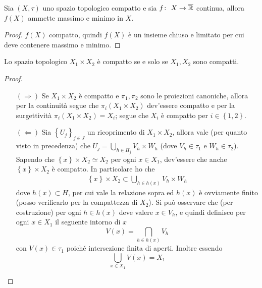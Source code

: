 \begin{corollary}[Weierstrass]
	Sia $(X, \tau)$ uno spazio topologico compatto e sia $f \colon\ X \rightarrow \overline{\mathbb{R}}$ continua, allora $f(X)$ ammette massimo e minimo in $X$.
\end{corollary} 
\begin{proof}
	$f(X)$ compatto, quindi $f(X)$ è un insieme chiuso e limitato per cui deve contenere massimo e minimo.
\end{proof}

\begin{theorem}[Tychonoff]
	Lo spazio topologico $X_1 \times X_2$ è compatto se e solo se $X_1,X_2$ sono compatti. 
\end{theorem} 
\begin{proof}\
	\begin{enumerate}
		\item[$(\Rightarrow)$] Se $X_1 \times X_2$ è compatto e $\pi_1, \pi_2$ sono le proiezioni canoniche, allora per la continuità segue che $\pi_i(X_1 \times X_2)$ dev'essere compatto e per la surgettività $ \pi_i(X_1 \times X_2) = X_i$; segue che $X_i$ è compatto per $i \in \left\{1,2\right\}$.
		\item[$(\Leftarrow)$] Sia $\left\{U_j\right\}_{j \in J}$ un ricoprimento di $X_1 \times X_2$, allora vale (per quanto visto in precedenza) che $U_j = \bigcup_{h \in H_j} V_h \times W_h$ (dove $V_h \in \tau_1$ e $W_h \in \tau_2$). \\ Sapendo che $\left\{x\right\} \times X_2 \simeq X_2$ per ogni  $x \in X_1$, dev'essere che anche $\left\{x\right\} \times X_2$ è compatto. In particolare ho che 
		\begin{equation}
		\begin{aligned}
			\left\{x\right\} \times X_2\subset \bigcup_{h \in h(x)} V_h \times W_h
		\end{aligned}
		\end{equation}
		dove $h(x) \subset H$, per cui vale la relazione sopra ed $h(x)$ è ovviamente finito (posso verificarlo per la compattezza di $X_2$). Si può osservare che (per costruzione) per ogni $h \in h(x)$ deve valere $x \in V_h$, e quindi definisco per ogni $x \in X_1$ il seguente intorno di $x$
		\begin{equation*}
			V(x) = \bigcap_{h \in h(x)} V_h
		\end{equation*}
		con $V(x) \in \tau_1$ poiché intersezione finita di aperti. Inoltre essendo 
		\begin{equation*}
			\bigcup_{x \in X_1} V(x) = X_1
		\end{equation*}

\end{enumerate}
\end{proof}
